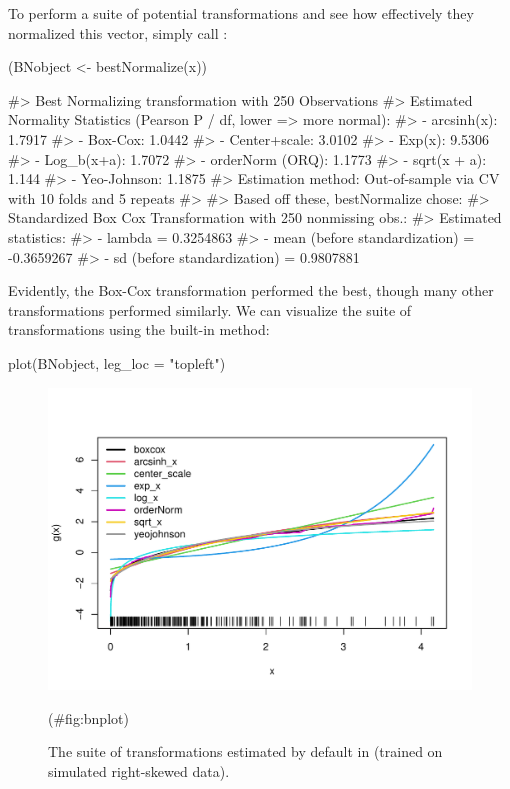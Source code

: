 To perform a suite of potential transformations and see how effectively
they normalized this vector, simply call :

\begin{Schunk}
\begin{Sinput}
(BNobject <- bestNormalize(x))
\end{Sinput}
\begin{Soutput}
#> Best Normalizing transformation with 250 Observations
#>  Estimated Normality Statistics (Pearson P / df, lower => more normal):
#>  - arcsinh(x): 1.7917
#>  - Box-Cox: 1.0442
#>  - Center+scale: 3.0102
#>  - Exp(x): 9.5306
#>  - Log_b(x+a): 1.7072
#>  - orderNorm (ORQ): 1.1773
#>  - sqrt(x + a): 1.144
#>  - Yeo-Johnson: 1.1875
#> Estimation method: Out-of-sample via CV with 10 folds and 5 repeats
#>  
#> Based off these, bestNormalize chose:
#> Standardized Box Cox Transformation with 250 nonmissing obs.:
#>  Estimated statistics:
#>  - lambda = 0.3254863 
#>  - mean (before standardization) = -0.3659267 
#>  - sd (before standardization) = 0.9807881
\end{Soutput}
\end{Schunk}

Evidently, the Box-Cox transformation performed the best, though many
other transformations performed similarly. We can visualize the suite of
transformations using the built-in  method:

\begin{Schunk}
\begin{Sinput}
plot(BNobject, leg_loc = "topleft")
\end{Sinput}
\begin{figure}

{\centering \includegraphics[width=1\linewidth]{figs/bnplot-1} 

}

\caption[The suite of transformations estimated by default in  (trained on simulated right-skewed data)]{The suite of transformations estimated by default in  (trained on simulated right-skewed data).}(\#fig:bnplot)
\end{figure}
\end{Schunk}

